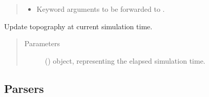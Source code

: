 \documentclass[letterpaper,10pt,english]{sphinxmanual}
\begin{document}
\begin{fulllineitems}
\begin{fulllineitems}
\begin{quote}
\begin{description}
\begin{itemize}
\item {} 
 \textendash{} Keyword arguments to be forwarded to .

\end{itemize}

\end{description}\end{quote}

\end{fulllineitems}


\begin{fulllineitems}
\label{\detokenize{api:grids.topography.Topography2d.update}}
Update topography at current simulation time.
\begin{quote}\begin{description}
\item[{Parameters}] \leavevmode
{} () \textendash{}  object, representing the elapsed simulation time.

\end{description}\end{quote}

\end{fulllineitems}


\end{fulllineitems}



\subsection{Parsers}
\label{\detokenize{api:parsers}}
\end{document}
